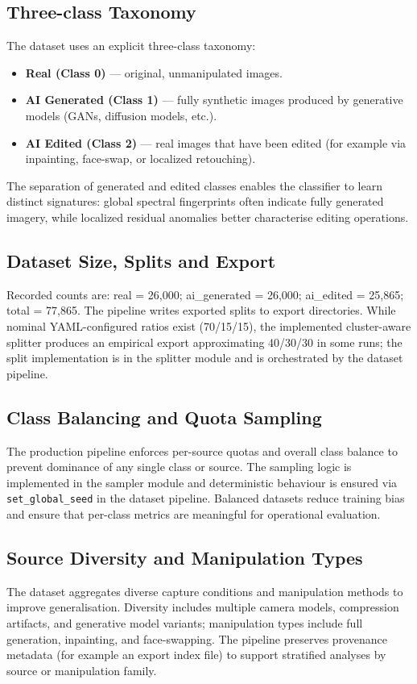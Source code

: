 \documentclass[11pt]{report}
\begin{document}
\subsection{Three-class Taxonomy}
The dataset uses an explicit three-class taxonomy:
\begin{itemize}
  \item \textbf{Real (Class 0)} — original, unmanipulated images.
  \item \textbf{AI Generated (Class 1)} — fully synthetic images produced by
  generative models (GANs, diffusion models, etc.).
  \item \textbf{AI Edited (Class 2)} — real images that have been edited (for
  example via inpainting, face-swap, or localized retouching).
\end{itemize}

The separation of generated and edited classes enables the classifier to learn
distinct signatures: global spectral fingerprints often indicate fully
generated imagery, while localized residual anomalies better characterise
editing operations.

\subsection{Dataset Size, Splits and Export}
Recorded counts are: real = 26,000; ai_generated = 26,000; ai_edited = 25,865; total = 77,865. The pipeline writes exported splits to export directories. While nominal YAML-configured ratios exist (70/15/15), the implemented cluster-aware splitter produces an empirical export approximating 40/30/30 in some runs; the split implementation is in the splitter module and is orchestrated by the dataset pipeline.

\subsection{Class Balancing and Quota Sampling}
The production pipeline enforces per-source quotas and overall class balance to
prevent dominance of any single class or source. The sampling logic is implemented in the sampler module and deterministic
behaviour is ensured via \texttt{set_global_seed} in the dataset pipeline.
Balanced datasets reduce training bias and ensure that per-class metrics are
meaningful for operational evaluation.

\subsection{Source Diversity and Manipulation Types}
The dataset aggregates diverse capture conditions and manipulation methods to
improve generalisation. Diversity includes multiple camera models, compression
artifacts, and generative model variants; manipulation types include full
generation, inpainting, and face-swapping. The pipeline preserves provenance
metadata (for example an export index file) to support stratified analyses
by source or manipulation family.
\end{document}
